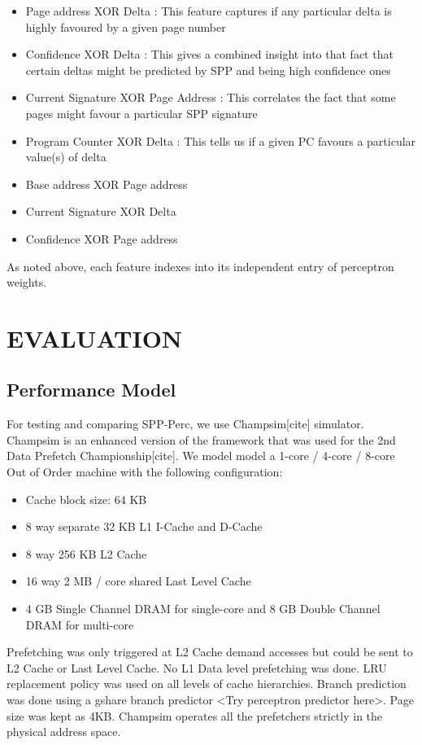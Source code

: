 \documentclass{sig-alternate}
\begin{document}
\begin{itemize}
\item Page address XOR Delta : This feature captures if any particular delta is highly favoured by a given page number
\item Confidence XOR Delta : This gives a combined insight into that fact that certain deltas might be predicted by SPP and being high confidence ones
\item Current Signature XOR Page Address : This correlates the fact that some pages might favour a particular SPP signature
\item Program Counter XOR Delta : This tells us if a given PC favours a particular value(s) of delta
\item Base address XOR Page address
\item Current Signature XOR Delta
\item Confidence XOR Page address
\end{itemize} 
As noted above, each feature indexes into its independent entry of perceptron weights.


\section{EVALUATION}
\subsection{Performance Model}
For testing and comparing SPP-Perc, we use Champsim[cite] simulator. Champsim is an enhanced version of the framework that was used for the 2nd Data Prefetch Championship[cite]. We model model a 1-core / 4-core / 8-core Out of Order machine with the following configuration:  

\begin{itemize}
    \item Cache block size: 64 KB
    \item 8 way separate 32 KB L1 I-Cache and D-Cache
    \item 8 way 256 KB L2 Cache
    \item 16 way 2 MB / core shared Last Level Cache
    \item 4 GB Single Channel DRAM for single-core and 8 GB Double Channel DRAM for multi-core
\end{itemize}
Prefetching was only triggered at L2 Cache demand accesses but could be sent to L2 Cache or Last Level Cache. No L1 Data level prefetching was done. LRU replacement policy was used on all levels of cache hierarchies. Branch prediction was done using a gshare branch predictor <Try perceptron predictor here>. Page size was kept as 4KB. Champsim operates all the prefetchers strictly in the physical address space.
\end{document}
